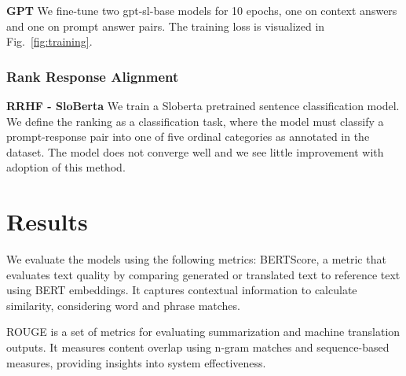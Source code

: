 \documentclass[fleqn,moreauthors,10pt]{ds_report}
\begin{document}
    \noindent\textbf{GPT} We fine-tune two gpt-sl-base models for 10 epochs, one on context answers and one on prompt answer pairs. The training loss is visualized in  Fig.~\ref{fig:training}.


    \subsubsection*{Rank Response Alignment}
    
    \noindent\textbf{RRHF - SloBerta}
    We train a Sloberta pretrained sentence classification model. We define the ranking as a classification task, where the model must classify a prompt-response pair into one of five ordinal categories as annotated in the dataset. The model does not converge well and we see little improvement with adoption of this method.



\section*{Results}


    We evaluate the models using the following metrics:
    BERTScore, a metric that evaluates text quality by comparing generated or translated text to reference text using BERT embeddings. It captures contextual information to calculate similarity, considering word and phrase matches.

    ROUGE is a set of metrics for evaluating summarization and machine translation outputs. It measures content overlap using n-gram matches and sequence-based measures, providing insights into system effectiveness.
\end{document}
